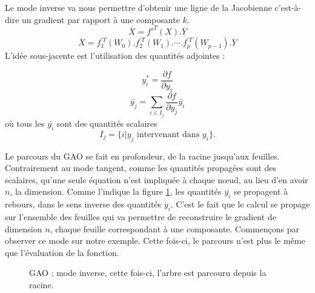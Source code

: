 Le mode inverse va nous permettre d'obtenir une ligne de la Jacobienne c'est-\`a-dire un gradient par rapport \`a 
une composante $k$.
$$\overline{X}=f'^T(X).\overline{Y}$$ 
\begin{equation}\overline{X}=f_{1}^{'T}(W_{0}) . f_{2}^{'T}(W_{1}) . \cdots .f_p^{'T}(W_{p-1}) . \overline{Y}
\label{eq:inv}
\end{equation}
L'id\'ee sous-jacente est l'utilisation des quantit\'es adjointes :

$$y_i^*= \frac{\partial f}{\partial y_i} $$
$$\bar{y_j}= \sum_{i \in I_j} \frac{\partial f}{\partial y_j}\bar{y_i}$$
o\`u tous les $\bar{y_i}$ sont des quantit\'es scalaires
 $$I_j=\{i | y_j \text{ intervenant dans } y_i\}.$$


Le parcours du GAO se fait en profondeur, de la racine jusqu'aux feuilles. Contrairement au mode tangent,
comme les quantit\'es propag\'ees sont des scalaires, qu'une seule \'equation n'est impliqu\'ee \`a chaque n\oe ud,
 au lieu d'en avoir $n$, la dimension. Comme l'indique la figure \ref{fig:modeinverse}, les quantit\'es $\bar{y_i}$ se
propagent \`a rebours, dans le sens inverse des quantit\'es $\dot{y_i}$. C'est le fait
que le calcul se propage sur l'ensemble des feuilles qui va permettre de reconstruire le gradient de dimension $n$, chaque feuille
correspondant \`a une composante.
Commençons par observer ce mode sur notre exemple. Cette fois-ci, le parcours n'est plus le même que 
l'\'evaluation de la fonction.


\begin{figure}
\caption{GAO : mode inverse, cette fois-ci, l'arbre est parcouru depuis la racine.}
\begin{center}
\end{center}
\label{fig:modeinverse}
\end{figure}


